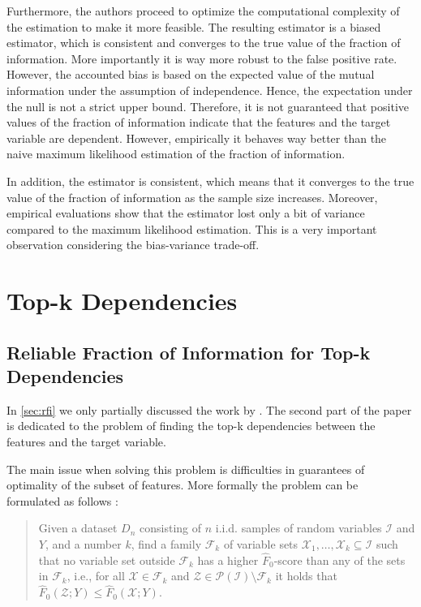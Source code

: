 \documentclass{article}
\begin{document}
Furthermore, the authors proceed to optimize the computational complexity of the estimation to make it more feasible. The resulting estimator is a biased estimator, which is consistent and converges to the true value of the fraction of information. More importantly it is way more robust to the false positive rate. However, the accounted bias is based on the expected value of the mutual information under the assumption of independence. Hence, the expectation under the null is not a strict upper bound. Therefore, it is not guaranteed that positive values of the fraction of information indicate that the features and the target variable are dependent. However, empirically it behaves way better than the naive maximum likelihood estimation of the fraction of information. 

In addition, the estimator is consistent, which means that it converges to the true value of the fraction of information as the sample size increases. Moreover, empirical evaluations show that the estimator lost only a bit of variance compared to the maximum likelihood estimation. This is a very important observation considering the bias-variance trade-off.

\section{Top-k Dependencies}
\subsection{Reliable Fraction of Information for Top-k Dependencies}
In \autoref{sec:rfi} we only partially discussed the work by \cite{mandros2017}. The second part of the paper is dedicated to the problem of finding the top-k dependencies between the features and the target variable. 

The main issue when solving this problem is difficulties in guarantees of optimality of the subset of features. More formally the problem can be formulated as follows \citep{mandros2017}:

\begin{quote}
    Given a dataset $D_n$ consisting of $n$ i.i.d. samples of random variables $\mathcal{I}$ and $Y$, and a number $k$, find a family $\mathcal{F}_k$ of variable sets 
    $\mathcal{X}_1, \ldots, \mathcal{X}_k \subseteq \mathcal{I}$ such that no variable set outside $\mathcal{F}_k$ has a higher $\hat{F}_0$-score than any of the sets in $\mathcal{F}_k$, 
    i.e., for all $\mathcal{X} \in \mathcal{F}_k$ and $\mathcal{Z} \in \mathcal{P}(\mathcal{I}) \setminus \mathcal{F}_k$ it holds that $
    \hat{F}_0(\mathcal{Z}; Y) \leq \hat{F}_0(\mathcal{X}; Y).$
\end{quote}
\end{document}
